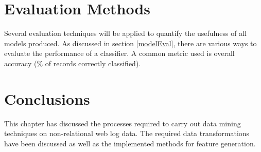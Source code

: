 \section{Evaluation Methods}
Several evaluation techniques will be applied to quantify the usefulness of all models produced. As discussed in section \ref{modelEval}, there are various ways to evaluate the performance of a classifier. A common metric used is overall accuracy (\% of records correctly classified). 


\section{Conclusions}\label{desConc}
This chapter has discussed the processes required to carry out data mining techniques on non-relational web log data. The required data transformations have been discussed as well as the implemented methods for feature generation.

